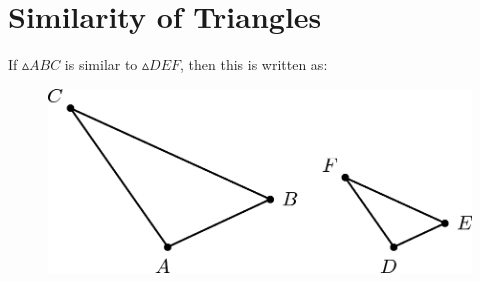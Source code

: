             \section{ Similarity of Triangles}
            \nopagebreak
      \label{m39405*id78153}If \begin{math}▵ABC\end{math} is similar to \begin{math}▵DEF\end{math}, then this is written as:\par 
      \label{m39405*id78186}\nopagebreak\noindent{}
      \label{m39405*id78214}
    \setcounter{subfigure}{0}
	\begin{figure}[H] %
    \begin{center}
    \label{m39405*id78218!!!underscore!!!media}\label{m39405*id78218!!!underscore!!!printimage}\includegraphics{col11306.imgs/m39405_MG10C15_001.png} %
      \vspace{2pt}
    \vspace{.1in}
    \end{center}
 \end{figure}       
